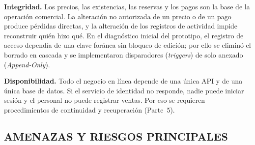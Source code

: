 \documentclass[12pt,letterpaper]{article}
\begin{document}
\textbf{Integridad.} Los precios, las existencias, las reservas y los pagos son la base de la operación comercial. La alteración no autorizada de un precio o de un pago produce pérdidas directas, y la alteración de los registros de actividad impide reconstruir quién hizo qué. En el diagnóstico inicial del prototipo, el registro de acceso dependía de una clave foránea sin bloqueo de edición; por ello se eliminó el borrado en cascada y se implementaron disparadores (\emph{triggers}) de solo anexado (\emph{Append-Only}).

\textbf{Disponibilidad.} Todo el negocio en línea depende de una única API y de una única base de datos. Si el servicio de identidad no responde, nadie puede iniciar sesión y el personal no puede registrar ventas. Por eso se requieren procedimientos de continuidad y recuperación (Parte~5).
\pagebreak
\subsection{AMENAZAS Y RIESGOS PRINCIPALES}
\end{document}
